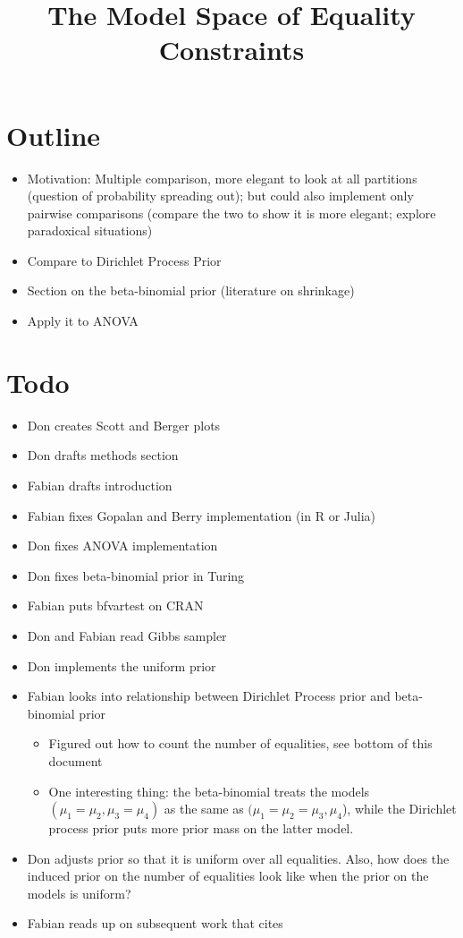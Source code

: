 \documentclass[]{article}
\title{The Model Space of Equality Constraints}
\author{}
\date{}
\begin{document}
\maketitle

\section{Outline}

\begin{itemize}
    \item Motivation: Multiple comparison, more elegant to look at all partitions (question of probability spreading out); but could also implement only pairwise comparisons (compare the two to show it is more elegant; explore paradoxical situations)
    \item Compare to Dirichlet Process Prior \parencite{gopalan1998bayesian}
    \item Section on the beta-binomial prior (literature on shrinkage)
    \item Apply it to ANOVA
\end{itemize}

\section{Todo}
\begin{itemize}
    \item Don creates Scott and Berger plots
    \item Don drafts methods section
    \item Fabian drafts introduction
    \item Fabian fixes Gopalan and Berry implementation (in R or Julia)
    \item Don fixes ANOVA implementation \checkmark
    \item Don fixes beta-binomial prior in Turing \checkmark
    \item Fabian puts bfvartest on CRAN
    \item Don and Fabian read Gibbs sampler \textcite{gopalan1998bayesian} \checkmark
    \item Don implements the uniform prior \checkmark
    \item Fabian looks into relationship between Dirichlet Process prior and beta-binomial prior \checkmark
    \begin{itemize}
        \item Figured out how to count the number of equalities, see bottom of this document
        \item One interesting thing: the beta-binomial treats the models $(\mu_1 = \mu_2, \mu_3 = \mu_4)$ as the same as $(\mu_1 = \mu_2 = \mu_3, \mu_4$), while the Dirichlet process prior puts more prior mass on the latter model.
    \end{itemize}
    \item Don adjusts prior so that it is uniform over all equalities. Also, how does the induced prior on the number of equalities look like when the prior on the models is uniform? \checkmark
    \item Fabian reads up on subsequent work that cites \textcite{gopalan1998bayesian} \checkmark
\end{itemize}
\end{document}
